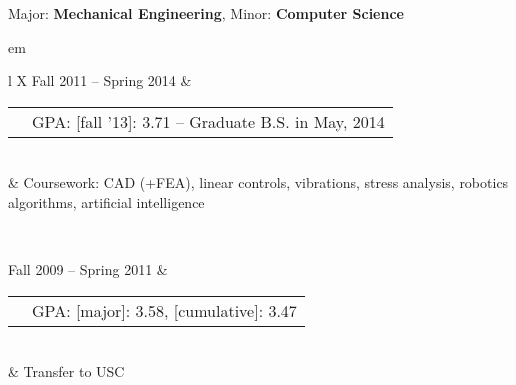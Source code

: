 

{\centering \large{Major: \textbf{Mechanical Engineering}, Minor: \textbf{Computer Science}} \par }

	
{ em
\begin{tabu}{ L{\tabularIndent} X } \hhline{==}
	Fall 2011 -- Spring 2014 & 
	\begin{tabular}{ l | l }
		\mysubsection{University of Southern California} & GPA: [fall '13]: 3.71 -- Graduate B.S. in May, 2014 \\ \cline{1-1}
	\end{tabular}
	\\
	&
	Coursework: CAD (+FEA), linear controls, vibrations, stress analysis, robotics algorithms, artificial intelligence

\\ \hhline{==}

	Fall 2009 -- Spring 2011 & 
	\begin{tabular}{ l | l }
		\mysubsection{University of Massachusetts, Amherst} & GPA: [major]: 3.58, [cumulative]: 3.47 \\ \cline{1-1}
	\end{tabular}
	\\
	& Transfer to USC
\end{tabu}}